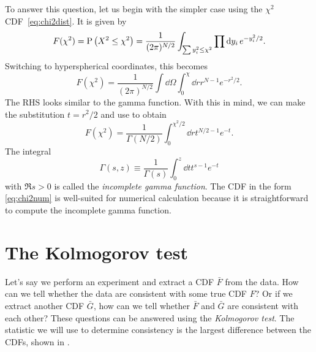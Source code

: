 To answer this question, let us begin with the simpler case using
the $\chi^2$ CDF~\eqref{eq:chi2dist}. It is given by
\begin{equation}
  F(\chi^2)=\operatorname{P}\left(X^2\le\chi^2\right)
           =\frac{1}{(2\pi)^{N/2}}\int_{\sum y_i^2\le\chi^2}
            \prod\dd{y_i}e^{-y_i^2/2}.
\end{equation}
Switching to hyperspherical coordinates, this becomes
\begin{equation}
  F(\chi^2)=\frac{1}{(2\pi)^{N/2}}
              \int\dd{\Omega}\int_0^\chi\dd{r}r^{N-1}e^{-r^2/2}.
\end{equation}
The RHS looks similar to the gamma function. With this in mind,
we can make the substitution $t=r^2/2$ and use 
to obtain
\begin{equation}\label{eq:chi2num}
  F(\chi^2)=\frac{1}{\Gamma(N/2)}\int_0^{\chi^2/2}\dd{r}t^{N/2-1}e^{-t}.
\end{equation}
  The integral
  \begin{equation}
    \Gamma(s,z)\equiv\frac{1}{\Gamma(s)}\int_0^z\dd{t}t^{s-1}e^{-t}
  \end{equation}
  with $\Re s>0$ is called the {\it incomplete gamma function}.
The CDF in the form \eqref{eq:chi2num} is well-suited for numerical
calculation because it is straightforward to compute the incomplete
gamma function.


\section{The Kolmogorov test}
Let's say we perform an experiment and extract a CDF $\bar{F}$ from 
the data. How can we tell whether the data are consistent with some
true CDF $F$? Or if we extract another CDF $\bar{G}$, how can
we tell whether $\bar{F}$ and $\bar{G}$ are consistent with each other?
These questions can be answered using the {\it Kolmogorov test}.
The statistic we will use to determine consistency is the
largest difference between the CDFs, shown in
.

